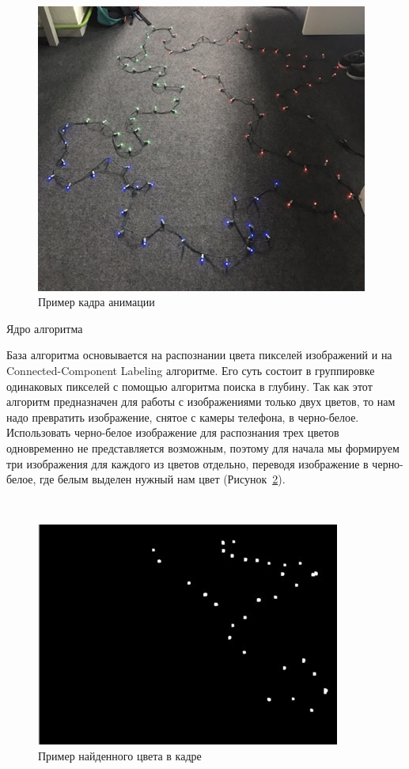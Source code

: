 ~
\begin{figure}[H]
\centering
	\includegraphics[scale=0.8]{figures/calibration/animation.jpg}
	\caption{Пример кадра анимации}
	\label{fig:develop:algorithm:animation}
\end{figure}

Ядро алгоритма
\label{sec:develop:algorithm:core}

База алгоритма основывается на распознании цвета пикселей изображений и на Connected-Component Labeling алгоритме. Его суть состоит в группировке одинаковых пикселей с помощью алгоритма поиска в глубину. Так как этот алгоритм предназначен для работы с изображениями только двух цветов, то нам надо превратить изображение, снятое с камеры телефона, в черно-белое. Использовать черно-белое изображение для распознания трех цветов одновременно не представляется возможным, поэтому для начала мы формируем три изображения для каждого из цветов отдельно, переводя изображение в черно-белое, где белым выделен нужный нам цвет (Рисунок~\ref{fig:develop:algorithm:colorFinding}).

~
\begin{figure}[H]
\centering
	\includegraphics[scale=0.8]{figures/calibration/findedColor.jpg}
	\caption{Пример найденного цвета в кадре}
	\label{fig:develop:algorithm:colorFinding}
\end{figure}

